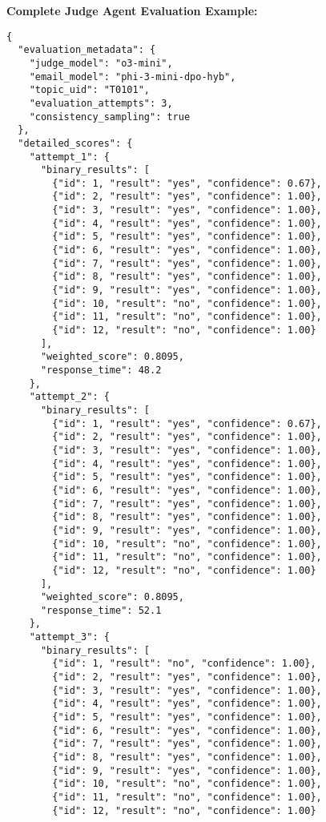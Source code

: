 \textbf{Complete Judge Agent Evaluation Example:}
\begin{verbatim}
{
  "evaluation_metadata": {
    "judge_model": "o3-mini",
    "email_model": "phi-3-mini-dpo-hyb",
    "topic_uid": "T0101",
    "evaluation_attempts": 3,
    "consistency_sampling": true
  },
  "detailed_scores": {
    "attempt_1": {
      "binary_results": [
        {"id": 1, "result": "yes", "confidence": 0.67},
        {"id": 2, "result": "yes", "confidence": 1.00},
        {"id": 3, "result": "yes", "confidence": 1.00},
        {"id": 4, "result": "yes", "confidence": 1.00},
        {"id": 5, "result": "yes", "confidence": 1.00},
        {"id": 6, "result": "yes", "confidence": 1.00},
        {"id": 7, "result": "yes", "confidence": 1.00},
        {"id": 8, "result": "yes", "confidence": 1.00},
        {"id": 9, "result": "yes", "confidence": 1.00},
        {"id": 10, "result": "no", "confidence": 1.00},
        {"id": 11, "result": "no", "confidence": 1.00},
        {"id": 12, "result": "no", "confidence": 1.00}
      ],
      "weighted_score": 0.8095,
      "response_time": 48.2
    },
    "attempt_2": {
      "binary_results": [
        {"id": 1, "result": "yes", "confidence": 0.67},
        {"id": 2, "result": "yes", "confidence": 1.00},
        {"id": 3, "result": "yes", "confidence": 1.00},
        {"id": 4, "result": "yes", "confidence": 1.00},
        {"id": 5, "result": "yes", "confidence": 1.00},
        {"id": 6, "result": "yes", "confidence": 1.00},
        {"id": 7, "result": "yes", "confidence": 1.00},
        {"id": 8, "result": "yes", "confidence": 1.00},
        {"id": 9, "result": "yes", "confidence": 1.00},
        {"id": 10, "result": "no", "confidence": 1.00},
        {"id": 11, "result": "no", "confidence": 1.00},
        {"id": 12, "result": "no", "confidence": 1.00}
      ],
      "weighted_score": 0.8095,
      "response_time": 52.1
    },
    "attempt_3": {
      "binary_results": [
        {"id": 1, "result": "no", "confidence": 1.00},
        {"id": 2, "result": "yes", "confidence": 1.00},
        {"id": 3, "result": "yes", "confidence": 1.00},
        {"id": 4, "result": "yes", "confidence": 1.00},
        {"id": 5, "result": "yes", "confidence": 1.00},
        {"id": 6, "result": "yes", "confidence": 1.00},
        {"id": 7, "result": "yes", "confidence": 1.00},
        {"id": 8, "result": "yes", "confidence": 1.00},
        {"id": 9, "result": "yes", "confidence": 1.00},
        {"id": 10, "result": "no", "confidence": 1.00},
        {"id": 11, "result": "no", "confidence": 1.00},
        {"id": 12, "result": "no", "confidence": 1.00}

\end{verbatim}
